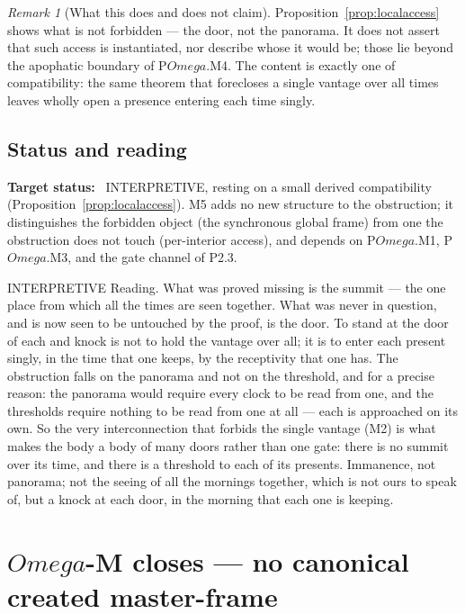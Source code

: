 \documentclass[11pt,a4paper]{article}
\def\Omega{Omega}%
\def\emph#1{#1}%
\newcommand{\stInterp}{\textcolor{cInt}{\textsf{\small INTERPRETIVE}}}
\theoremstyle{definition}
\theoremstyle{plain}
\theoremstyle{remark}
\newtheorem{remark}[definition]{Remark}
\begin{document}
\begin{remark}[What this does and does not claim]\label{rem:m5boundary}
Proposition~\ref{prop:localaccess} shows what is \emph{not forbidden} --- the door, not the
panorama. It does not assert that such access is instantiated, nor describe whose it would be;
those lie beyond the apophatic boundary of P$\Omega$.M4. The content is exactly one of
compatibility: the same theorem that forecloses a single vantage over all times leaves wholly
open a presence entering each time singly.
\end{remark}

\subsection{Status and reading}

\textbf{Target status:}~
\stInterp, resting on a small derived compatibility (Proposition~\ref{prop:localaccess}). M5
adds no new structure to the obstruction; it distinguishes the forbidden object (the synchronous
global frame) from one the obstruction does not touch (per-interior access), and depends on
P$\Omega$.M1, P$\Omega$.M3, and the gate channel of P2.3.

\medskip
\stInterp\quad
\emph{Reading.}
What was proved missing is the summit --- the one place from which all the times are seen
together. What was never in question, and is now seen to be untouched by the proof, is the door.
To stand at the door of each and knock is not to hold the vantage over all; it is to enter each
present singly, in the time that one keeps, by the receptivity that one has. The obstruction
falls on the panorama and not on the threshold, and for a precise reason: the panorama would
require every clock to be read from one, and the thresholds require nothing to be read from one
at all --- each is approached on its own. So the very interconnection that forbids the single
vantage (M2) is what makes the body a body of many doors rather than one gate: there is no
summit over its time, and there is a threshold to each of its presents. Immanence, not panorama;
not the seeing of all the mornings together, which is not ours to speak of, but a knock at each
door, in the morning that each one is keeping.

\section*{\(\Omega\)-M closes --- no canonical created master-frame}
\end{document}
